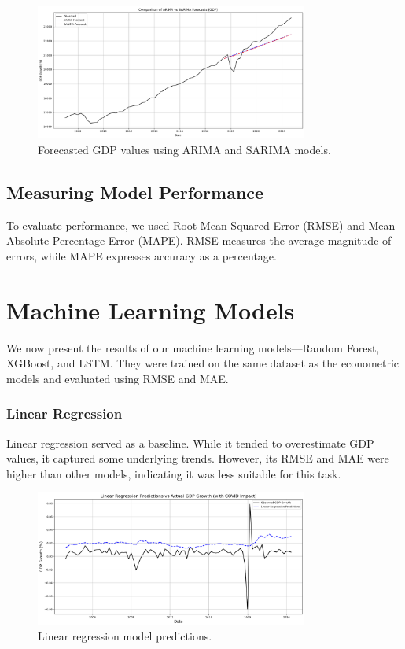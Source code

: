 \begin{figure}[ht]
    \centering
    \includegraphics[width=0.8\textwidth]{../images/us_gdp_econometric_models.png}
    \caption{Forecasted GDP values using ARIMA and SARIMA models.}
    \label{fig:gdp_forecast}
\end{figure}

\subsection{Measuring Model Performance}
\label{subsubsec:model_performance}

To evaluate performance, we used Root Mean Squared Error (RMSE) and Mean Absolute Percentage Error (MAPE). RMSE measures the average magnitude of errors, while MAPE expresses accuracy as a percentage.

\section{Machine Learning Models}
\label{subsec:machine_learning_models}

We now present the results of our machine learning models—Random Forest, XGBoost, and LSTM. They were trained on the same dataset as the econometric models and evaluated using RMSE and MAE.

\subsubsection{Linear Regression}
\label{subsubsec:linear_regression}

Linear regression served as a baseline. While it tended to overestimate GDP values, it captured some underlying trends. However, its RMSE and MAE were higher than other models, indicating it was less suitable for this task.

\begin{figure}[ht]
    \centering
    \includegraphics[width=0.8\textwidth]{../images/lr.png}
    \caption{Linear regression model predictions.}
    \label{fig:linear_regression_predictions}
\end{figure}

